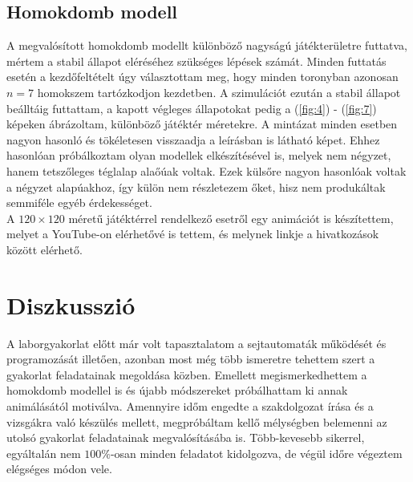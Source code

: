 \begin{multicols}{2}
\subsection{Homokdomb modell}
A megvalósított homokdomb modellt különböző nagyságú játékterületre futtatva, mértem a stabil állapot eléréséhez szükséges lépések számát. Minden futtatás esetén a kezdőfeltételt úgy választottam meg, hogy minden toronyban azonosan $n = 7$ homokszem tartózkodjon kezdetben. A szimulációt ezután a stabil állapot beálltáig futtattam, a kapott végleges állapotokat pedig a (\ref{fig:4}) - (\ref{fig:7}) képeken ábrázoltam, különböző játéktér méretekre. A mintázat minden esetben nagyon hasonló és tökéletesen visszaadja a \citep{csabaisandpile} leírásban is látható képet. Ehhez hasonlóan próbálkoztam olyan modellek elkészítésével is, melyek nem négyzet, hanem tetszőleges téglalap alaőúak voltak. Ezek külsőre nagyon hasonlóak voltak a négyzet alapúakhoz, így külön nem részletezem őket, hisz nem produkáltak semmiféle egyéb érdekességet. \\
A $120 \times 120$ méretű játéktérrel rendelkező esetről egy animációt is készítettem, melyet a YouTube-on elérhetővé is tettem, és melynek linkje a hivatkozások között elérhető\nocite{yt}.

\section{Diszkusszió} \label{sec:5}
A laborgyakorlat előtt már volt tapasztalatom a sejtautomaták működését és programozását illetően, azonban most még több ismeretre tehettem szert a gyakorlat feladatainak megoldása közben. Emellett megismerkedhettem a homokdomb modellel is és újabb módszereket próbálhattam ki annak animálásától motiválva. Amennyire időm engedte a szakdolgozat írása és a vizsgákra való készülés mellett, megpróbáltam kellő mélységben belemenni az utolsó gyakorlat feladatainak megvalósításába is. Több-kevesebb sikerrel, egyáltalán nem $100\%$-osan minden feladatot kidolgozva, de végül időre végeztem elégséges módon vele.

\end{multicols}